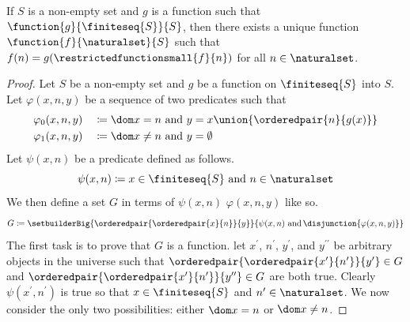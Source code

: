 \begin{recursion-theorem}
     \label{recursion-theorem:sequence-form}
    If \( S \) is a non-empty set and \( g \) is a function such that \( \function{g}{ \finiteseq{S} }{S} \),
    then there exists a unique function \( \function{f}{\naturalset}{S} \) such that
    \( f(n) = g( \restrictedfunctionsmall{f}{n} ) \) for all \( n \in \naturalset \).
\end{recursion-theorem}

\begin{proof}
    Let \( S \) be a non-empty set and \( g \) be a function on \( \finiteseq{S} \) into \( S \).
    Let \( \varphi(x, n, y) \) be a sequence of two predicates such that
    \begin{alignat*}{2}
        &\varphi_{0}(x, n, y) &&\coloneq \dom x = n \ \text{and} \ y = x \union \mleft\{ \orderedpair{n}{g(x)} \mright\} \\
        &\varphi_{1}(x, n, y) &&\coloneq \dom x \neq n \ \text{and} \ y = \emptyset
    \end{alignat*}
    Let \( \psi(x, n) \) be a predicate defined as follows.
    \begin{equation*}
        \psi(x, n) \coloneq x \in \finiteseq{S} \ \text{and} \ n \in \naturalset
    \end{equation*}
    We then define a set \( G \) in terms of \( \psi(x, n) \) \( \varphi(x, n, y) \) like so.
    \begin{equation*}
        G \coloneq \setbuilderBig{\orderedpair{\orderedpair{x}{n}}{y}}{ \psi(x, n) \ \text{and} \, \disjunction{\varphi(x, n, y)} }
    \end{equation*}
    The first task is to prove that \( G \) is a function.
    let \( x^{\prime} \), \( n^{\prime} \), \( y^{\prime} \), and \( y^{\prime\prime} \) be arbitrary objects in the universe such that
    \( \orderedpair{\orderedpair{x^{\prime}}{n^{\prime}}}{y^{\prime}} \in G \) and \( \orderedpair{\orderedpair{x^{\prime}}{n^{\prime}}}{y^{\prime\prime}} \in G \)
    are both true.
    Clearly \( \psi(x^{\prime}, n^{\prime}) \) is true so that \( x \in \finiteseq{S} \) and \( n^{\prime} \in \naturalset \).
    We now consider the only two possibilities: either \( \dom x = n \) or \( \dom x \neq n \).


\end{proof}
